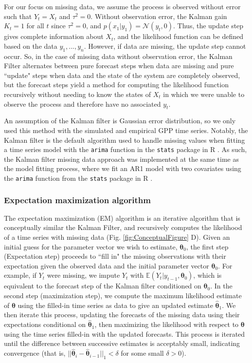 \documentclass{article}
\begin{document}
\begin{linenumbers}
For our focus on missing data, we assume the process is observed without error such that $Y_t = X_t$ and $\tau^2 = 0$. Without observation error, the Kalman gain $K_t = 1$ for all $t$ since $\tau^2 = 0$, and $p(x_1 | y_1) = \mathcal{N}(y_t, 0)$. Thus, the update step gives complete information about $X_t$, and the likelihood function can be defined based on the data $y_1,...,y_n$. However, if data are missing, the update step cannot occur. So, in the case of missing data without observation error, the Kalman Filter alternates between pure forecast steps when data are missing and pure ``update" steps when data and the state of the system are completely observed, but the forecast steps yield a method for computing the likelihood function recursively without needing to know the states of $X_t$ in which we were unable to observe the process and therefore have no associated $y_t$.

An assumption of the Kalman filter is Gaussian error distribution, so we only used this method with the simulated and empirical GPP time series. Notably, the Kalman filter is the default algorithm used to handle missing values when fitting a time series model with the \texttt{arima} function in the \texttt{stats} package in R \citep{r_2021}. As such, the Kalman filter missing data approach was implemented at the same time as the model fitting process, where we fit an AR1 model with two covariates using the \texttt{arima} function from the \texttt{stats} package in R \citep{r_2021}. 

\subsubsection*{Expectation maximization algorithm}

The expectation maximization (EM) algorithm is an iterative algorithm that is conceptually similar the Kalman Filter, and recursively computes the likelihood of a time series with missing data (Fig. \ref{fig:ConceptualFigure} D). Given an initial guess for the parameter vector we wish to estimate, ${\bm \theta}_0$, the first step (Expectation step) proceeds to ``fill in" the missing observations with their expectation given the observed data and the initial parameter vector ${\bm \theta}_0$. For example, if $Y_t$ were missing, we impute $Y_t$ with $\mathbb{E}(Y_t | y_{t-1}, {\bm \theta}_0)$, which is equivalent to the forecast step of the Kalman filter conditioned on ${\bm \theta}_0$. In the second step (maximization step), we compute the maximum likelihood estimate of ${\bm \theta}$ using the filled-in time series as data to give an updated estimate $\hat {\bm \theta}_1$. We then iterate this process, updating the forecasts of the missing data using their expectations conditional on $\hat {\bm \theta}_1$, then maximizing the likelihood with respect to $\bm \theta$ using the time series filled-in with the updated forecasts. This process is iterated until the difference between successive estimates is acceptably small, indicating convergence (that is, $||\hat {\bm \theta}_i - \hat {\bm \theta}_{i-1}||_1 < \delta$ for some small $\delta > 0$).


\end{linenumbers}
\end{document}
